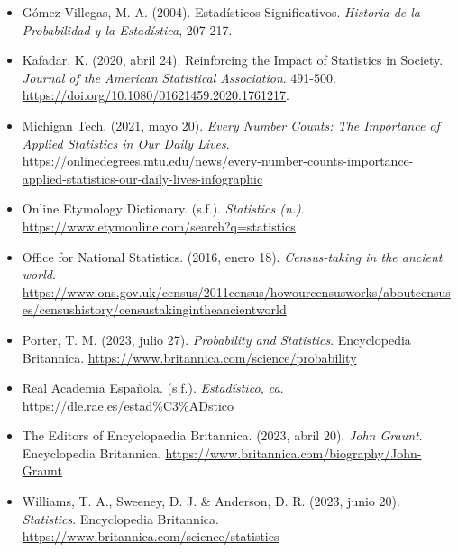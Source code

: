 \documentclass[12pt, a4paper]{article}
\begin{document}
\begin{itemize}
	\item Gómez Villegas, M. A. (2004). Estadísticos Significativos. \textit{Historia de la Probabilidad y la Estadística}, 207-217.

	\item Kafadar, K. (2020, abril 24). Reinforcing the Impact of Statistics in Society. \textit{Journal of the American Statistical Association}. 491-500. \url{https://doi.org/10.1080/01621459.2020.1761217}.

	\item Michigan Tech. (2021, mayo 20). \textit{Every Number Counts: The Importance of Applied Statistics in Our Daily Lives}. \url{https://onlinedegrees.mtu.edu/news/every-number-counts-importance-applied-statistics-our-daily-lives-infographic}

	\item Online Etymology Dictionary. (s.f.). \textit{Statistics (n.)}. \url{https://www.etymonline.com/search?q=statistics}

	\item Office for National Statistics. (2016, enero 18). \textit{Census-taking in the ancient world}. \url{https://www.ons.gov.uk/census/2011census/howourcensusworks/aboutcensuses/censushistory/censustakingintheancientworld}

	\item Porter, T. M. (2023, julio 27). \textit{Probability and Statistics}. Encyclopedia Britannica. \url{https://www.britannica.com/science/probability}

	\item Real Academia Española. (s.f.). \textit{Estadístico, ca}. \url{https://dle.rae.es/estad%C3%ADstico}

	\item The Editors of Encyclopaedia Britannica. (2023, abril 20). \textit{John Graunt}. Encyclopedia Britannica. \url{https://www.britannica.com/biography/John-Graunt}

	\item Williams, T. A., Sweeney, D. J. \& Anderson, D. R. (2023, junio 20). \textit{Statistics}. Encyclopedia Britannica. \url{https://www.britannica.com/science/statistics}
\end{itemize}
\end{document}
